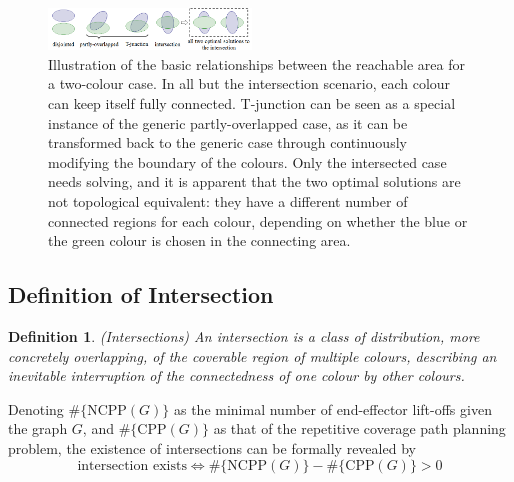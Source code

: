 \documentclass[journal]{IEEEtran}
\newtheorem{definition}[theorem]{Definition}
\begin{document}

\begin{figure}[t]
\centering
\includegraphics[width = 0.48\textwidth]{figures/basic_shape_3}
\caption{Illustration of the basic relationships between the reachable area for a two-colour case. In all but the intersection scenario, each colour can keep itself fully connected. T-junction can be seen as a special instance of the generic partly-overlapped case, as it can be transformed back to the generic case through continuously modifying the boundary of the colours. Only the intersected case needs solving, and it is apparent that the two optimal solutions are not topological equivalent: they have a different number of connected regions for each colour, depending on whether the blue or the green colour is chosen in the connecting area.}
\label{fig:basic_shape}
\end{figure}





\subsection{Definition of Intersection}
\begin{definition}
(Intersections) An intersection is a class of distribution, more concretely overlapping, of the coverable region of multiple colours, describing an inevitable interruption of the connectedness of one colour by other colours. 
\end{definition}
Denoting $\#\{\mbox{NCPP}(G)\}$ as the minimal number of end-effector lift-offs given the graph $G$, and 
$\#\{\mbox{CPP}(G)\}$ as that of the repetitive coverage path planning problem, the existence of intersections can be formally revealed by
\begin{equation}
\mbox{intersection exists}\Leftrightarrow \#\{\mbox{NCPP}(G)\} - \#\{\mbox{CPP}(G)\} > 0
\end{equation} 
\end{document}
